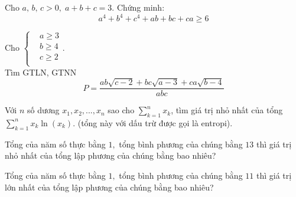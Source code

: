 \begin{bt}
 Cho $a,\,b,\,c > 0, \; a+b+c=3$. Chứng minh:$$a^{4}+b^{4}+c^{4}+ab+bc+ca \geq 6$$	
\end{bt}
\begin{bt}%
Cho	$\left\{\begin{aligned}
	&a \geq 3\\
	&b \geq 4\\
	&c \geq 2\\
	\end{aligned}\right.$. \\
	Tìm GTLN, GTNN $$P = \dfrac{ab\sqrt{c-2}+bc\sqrt{a-3}+ca\sqrt{b-4}}{abc}$$
\end{bt}
\begin{bt} %
	Với $n$ số dương $x_1, x_2,..., x_n$ sao cho $\sum\limits_{k = 1}^n {{x_k}} $, tìm giá trị nhỏ nhất của tổng $\sum\limits_{k = 1}^n {{x_k}} \ln \left( {{x_k}} \right).$ (tổng này với dấu trừ được gọi là entropi).
\end{bt}

\begin{bt} %
	Tổng của năm số thực bằng $1,$ tổng bình phương của chúng bằng $13$ thì giá trị nhỏ nhất của tổng lập phương của chúng bằng bao nhiêu?
\end{bt}

\begin{bt} %
	Tổng của năm số thực bằng $1,$ tổng bình phương của chúng bằng $11$ thì giá trị lớn nhất của tổng lập phương của chúng bằng bao nhiêu?
\end{bt}

